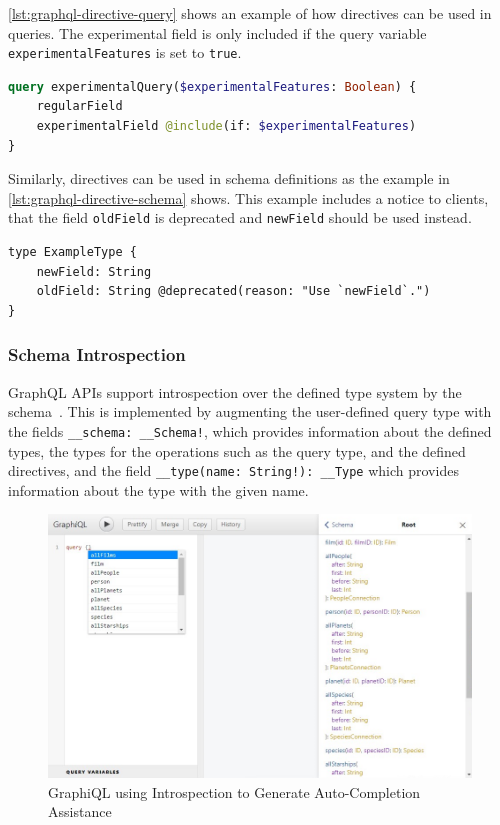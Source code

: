 \autoref{lst:graphql-directive-query} shows an example of how directives can be used in queries.
The experimental field is only included if the query variable \texttt{experimentalFeatures} is set to \texttt{true}.

\begin{lstlisting}[caption={Usage of a Directive in a GraphQL Query}, language=graphql, label={lst:graphql-directive-query}]
query experimentalQuery($experimentalFeatures: Boolean) {
    regularField
    experimentalField @include(if: $experimentalFeatures)
}
\end{lstlisting}

Similarly, directives can be used in schema definitions as the example in \autoref{lst:graphql-directive-schema} shows.
This example includes a notice to clients, that the field \texttt{oldField} is deprecated and \texttt{newField} should be used instead.

\begin{lstlisting}[caption={Usage of a Directive in a GraphQL Schema~\cite{Facebook2018}}, language=graphqls, label={lst:graphql-directive-schema}]
type ExampleType {
    newField: String
    oldField: String @deprecated(reason: "Use `newField`.")
}
\end{lstlisting}

\subsubsection{Schema Introspection}

GraphQL \acp{API} support introspection over the defined type system by the schema~\cite{Facebook2018}.
This is implemented by augmenting the user-defined query type with the fields \texttt{\_\_schema: \_\_Schema!}, which provides information about the defined types, the types for the operations such as the query type, and the defined directives, and the field \texttt{\_\_type(name: String!): \_\_Type} which provides information about the type with the given name.

\begin{figure}[htb!]
    \includegraphics[width=\textwidth]{images/graphiql-autocomplete.png}
    \caption{GraphiQL using Introspection to Generate Auto-Completion Assistance}\label{img:graphiql-introspection}
\end{figure}

